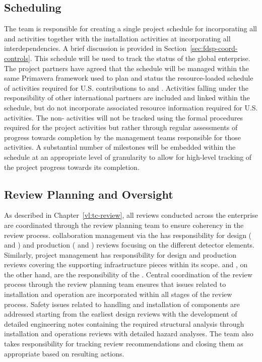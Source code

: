 \subsection{Scheduling}
\label{sec:dune_schedule}

The  team is responsible for creating a single project
schedule for  incorporating all  and
 activities together with the installation activities at
 incorporating all interdependencies. A brief discussion
is provided in Section~\ref{sec:fdsp-coord-controls}. This schedule
will be used to track the status of the global enterprise.  The
project partners have agreed that the  schedule 
will be managed within the same Primavera  framework used 
to plan and status the resource-loaded schedule of activities required 
for U.S.  contributions to  and .
Activities falling under the responsibility of other international
partners are included and linked within the  schedule, but 
do not incorporate associated resource information required for U.S. 
 activities.  The non- activities will not be 
tracked using the formal  procedures required for the 
 project activities but rather through regular assessments 
of progress towards completion by the management teams responsible 
for those activities.  A substantial number of milestones will be 
embedded within the schedule at an appropriate level of granularity 
to allow for high-level tracking of the project progress towards its 
completion.

\subsection{Review Planning and Oversight}
\label{sec:dune_review}

As described in Chapter~\ref{vl:tc-review}, all reviews conducted 
across the  enterprise are coordinated through 
the  review planning team to ensure coherency in the 
review process.   collaboration management via the 
 has responsibility for design ( and 
) and production ( and ) 
reviews focusing on the different detector elements.  Similarly, 
 project management has responsibility for design 
and production reviews covering the supporting infrastructure 
pieces within its scope.   and , on the 
other hand, are the responsibility of the .  Central 
coordination of the review process through the  review 
planning team ensures that issues related to installation and 
operation are incorporated within all stages of the review process.  
Safety issues related to handling and installation of components 
are addressed starting from the earliest design reviews with the 
development of detailed engineering notes containing the required 
structural analysis through installation and operations reviews 
with detailed hazard analyses.  The  team also takes 
responsibility for tracking review recommendations and closing 
them as appropriate based on resulting actions.


